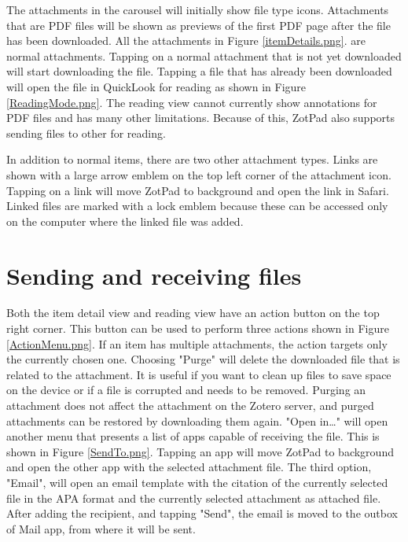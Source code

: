 \documentclass[oneside, openany, 12pt]{tufte-book}
\newcommand{\image}[2]{
	\center
	\fbox{\texttt{[image: images/iPhone/\{\#2]}}}

	\refstepcounter{figure}
	\smallskip\noindent\small Figure \thefigure: #1
	\label{#2}
	}
\newcommand{\ipadfootnote}[1]{}
\newcommand{\image}[2]{
	\caption{#1}
	\label{#2}
	\fbox{\texttt{[image: images/iPad/\{\#2]}}}
	}
\newcommand{\ipadfootnote}[1]{\footnote{#1}}
\begin{document}
The attachments in the carousel will initially show file type icons. Attachments that are PDF files will be shown as previews of the first PDF page after the file has been downloaded. All the attachments in Figure \ref{itemDetails.png}. are normal attachments. Tapping on a normal attachment\ipadfootnote{Both imported items and web site snapshots are normal items that can be downloaded and viewed on ZotPad.} that is not yet downloaded will start downloading the file. Tapping a file that has already been downloaded will open the file in QuickLook for reading as shown in Figure \ref{ReadingMode.png}. The reading view cannot currently show annotations for PDF files and has many other limitations. Because of this, ZotPad also supports sending files to other for reading.

In addition to normal items, there are two other attachment types. Links are shown with a large arrow emblem on the top left corner of the attachment icon. Tapping on a link will move ZotPad to background and open the link in Safari. Linked files are marked with a lock emblem because these can be accessed only on the computer where the linked file was added.

\begin{figure}
\image{Item details view}{itemDetails.png}
\end{figure}

\begin{figure}
\image{Reading view for attachment}{ReadingMode.png}
\end{figure}

\FloatBarrier

	\section{Sending and receiving files}

Both the item detail view and reading view have an action button on the top right corner. This button can be used to perform three actions shown in Figure \ref{ActionMenu.png}. If an item has multiple attachments, the action targets only the currently chosen one. Choosing "Purge" will delete the downloaded file that is related to the attachment. It is useful if you want to clean up files to save space on the device or if a file is corrupted and needs to be removed. Purging an attachment does not affect the attachment on the Zotero server, and purged attachments can be restored by downloading them again. "Open in\ldots" will open another menu that presents a list of apps capable of receiving the file. This is shown in Figure \ref{SendTo.png}. Tapping an app will move ZotPad to background and open the other app with the selected attachment file. The third option, "Email", will open an email template with the citation of the currently selected file in the APA format and the currently selected attachment as attached file. After adding the recipient, and tapping "Send", the email is moved to the outbox of Mail app, from where it will be sent.
\end{document}
